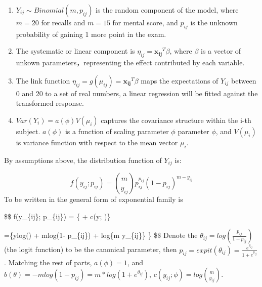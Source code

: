 \documentclass[
]{article}
\begin{document}
\begin{enumerate}
    \item $Y_{ij} \sim Binomial(m, p_{ij})$ is the random component of the model, where $m=20$ for recalls and $m=15$ for mental score, and $p_{ij}$ is the unknown probability of gaining 1 more point in the exam.
    \item The systematic or linear component is $\eta_{ij} = \mathbf{x_{ij}}^T \beta$, where $\beta$ is a vector of unkown parameters，representing the effect contributed by each variable.
    \item The link function $\eta_{ij} = g(\mu_{ij}) = \mathbf{x_{ij}}^T \beta$ maps the expectations of $Y_{ij}$ between 0 and 20 to a set of real numbers, a linear regression will be fitted against the transformed response.
    \item $Var(Y_i) = a(\phi) V(\mu_i)$ captures the covariance structure within the i-th subject. $a(\phi)$ is a function of scaling parameter $\phi$ parameter $\phi$, and $V(\mu_i)$ is variance function with respect to the mean vector $\mu_i$.
\end{enumerate}

By assumptions above, the distribution function of \(Y_{ij}\) is:

\[
f(y_{ij}; p_{ij}) = {m \choose y_{ij}} p_{ij}^{p_{ij}}  (1-p_{ij})^{m-y_{ij}}
\] To be written in the general form of exponential family is

\$\$ f(y\_\{ij\}; p\_\{ij\}) = \exp\{
 + c(y; \phi)\}

=\exp\{ylog() + mlog(1- p\_\{ij\}) + log\{m
\choose y\_\{ij\}\} \} \$\$ Denote the
\(\theta_{ij} = log(\frac{p_{ij}}{1-p_{ij}})\) (the logit function) to
be the canonical parameter, then
\(p_{ij} = expit(\theta_{ij}) = \frac{e^{\theta_{ij}}}{1 + e^{\theta_{ij}}}\).
Matching the rest of parts, \(a(\phi) = 1\), and
\(b(\theta) = -mlog(1- p_{ij}) = m*log(1 + e^{\theta_{ij}})\),
\(c(y_{ij}; \phi) = log{m \choose y_{ij}}\).
\end{document}

